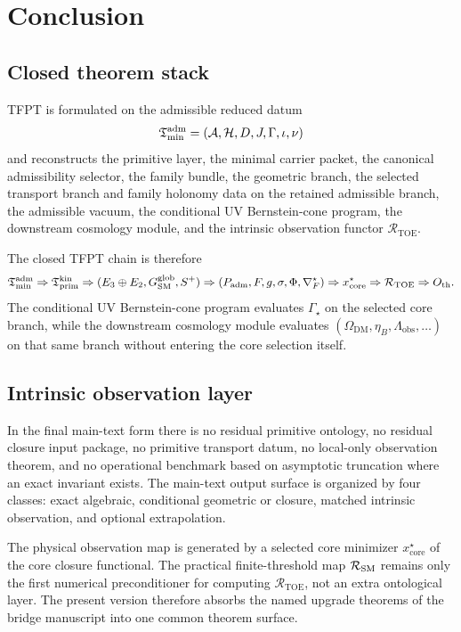 \section{Conclusion}

\subsection{Closed theorem stack}

TFPT is formulated on the admissible reduced datum
\[
\mathfrak T_{\mathrm{min}}^{\mathrm{adm}}=(\mathcal A,\mathcal H,D,J,\Gamma,\iota,\nu)
\]
and reconstructs the primitive layer, the minimal carrier packet, the canonical admissibility
selector, the family bundle, the geometric branch, the selected transport branch and family
holonomy data on the retained admissible branch, the admissible vacuum, the conditional UV
Bernstein-cone program, the downstream cosmology module, and the intrinsic observation functor
$\mathcal R_{\mathrm{TOE}}$.

The closed TFPT chain is therefore
\[
\mathfrak T_{\mathrm{min}}^{\mathrm{adm}}
\Rightarrow
\mathfrak T_{\mathrm{prim}}^{\mathrm{kin}}
\Rightarrow
(E_3\oplus E_2,G_{\mathrm{SM}}^{\mathrm{glob}},S^+)
\Rightarrow
(P_{\mathrm{adm}},F,g,\sigma,\Phi,\nabla_F^\star)
\Rightarrow
x_{\mathrm{core}}^\star
\Rightarrow
\mathcal R_{\mathrm{TOE}}
\Rightarrow
O_{\mathrm{th}}.
\]
The conditional UV Bernstein-cone program evaluates $\Gamma_\star$ on the selected core branch,
while the downstream cosmology module evaluates
$(\Omega_{\mathrm{DM}},\eta_B,\Lambda_{\mathrm{obs}},\ldots)$ on that same branch without
entering the core selection itself.

\subsection{Intrinsic observation layer}

In the final main-text form there is no residual primitive ontology, no residual closure input
package, no primitive transport datum, no local-only observation theorem, and no operational
benchmark based on asymptotic truncation where an exact invariant exists. The main-text output
surface is organized by four classes: exact algebraic, conditional geometric or closure, matched
intrinsic observation, and optional extrapolation.

The physical observation map is generated by a selected core minimizer
$x_{\mathrm{core}}^\star$ of the core closure functional. The practical finite-threshold map $\mathcal R_{\mathrm{SM}}$ remains only the first
numerical preconditioner for computing $\mathcal R_{\mathrm{TOE}}$, not an extra ontological
layer. The present version therefore absorbs the named upgrade theorems of the bridge manuscript
into one common theorem surface.

